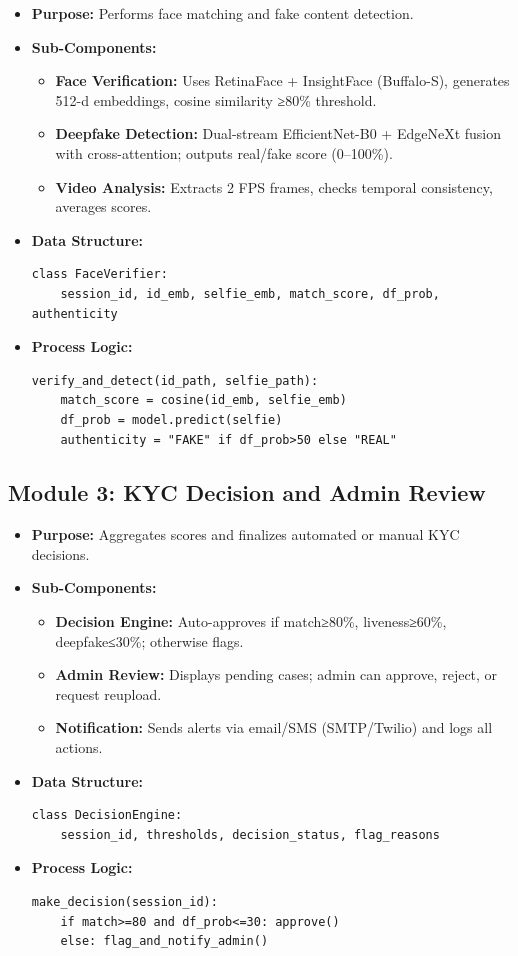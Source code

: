 \documentclass[12pt,a4paper]{article}
\begin{document}
\begin{itemize}
    \item \textbf{Purpose:} Performs face matching and fake content detection.
    \item \textbf{Sub-Components:} 
    \begin{itemize}
        \item \textbf{Face Verification:} Uses RetinaFace + InsightFace (Buffalo-S), generates 512-d embeddings, cosine similarity ≥80\% threshold.
        \item \textbf{Deepfake Detection:} Dual-stream EfficientNet-B0 + EdgeNeXt fusion with cross-attention; outputs real/fake score (0–100\%).
        \item \textbf{Video Analysis:} Extracts 2 FPS frames, checks temporal consistency, averages scores.
    \end{itemize}
    \item \textbf{Data Structure:}
\begin{verbatim}
class FaceVerifier:
    session_id, id_emb, selfie_emb, match_score, df_prob, authenticity
\end{verbatim}
    \item \textbf{Process Logic:}
\begin{verbatim}
verify_and_detect(id_path, selfie_path):
    match_score = cosine(id_emb, selfie_emb)
    df_prob = model.predict(selfie)
    authenticity = "FAKE" if df_prob>50 else "REAL"
\end{verbatim}
\end{itemize}

\subsection{Module 3: KYC Decision and Admin Review}

\begin{itemize}
    \item \textbf{Purpose:} Aggregates scores and finalizes automated or manual KYC decisions.
    \item \textbf{Sub-Components:}
    \begin{itemize}
        \item \textbf{Decision Engine:} Auto-approves if match≥80\%, liveness≥60\%, deepfake≤30\%; otherwise flags.
        \item \textbf{Admin Review:} Displays pending cases; admin can approve, reject, or request reupload.
        \item \textbf{Notification:} Sends alerts via email/SMS (SMTP/Twilio) and logs all actions.
    \end{itemize}
    \item \textbf{Data Structure:}
\begin{verbatim}
class DecisionEngine:
    session_id, thresholds, decision_status, flag_reasons
\end{verbatim}
    \item \textbf{Process Logic:}
\begin{verbatim}
make_decision(session_id):
    if match>=80 and df_prob<=30: approve()
    else: flag_and_notify_admin()
\end{verbatim}
\end{itemize}
\end{document}
